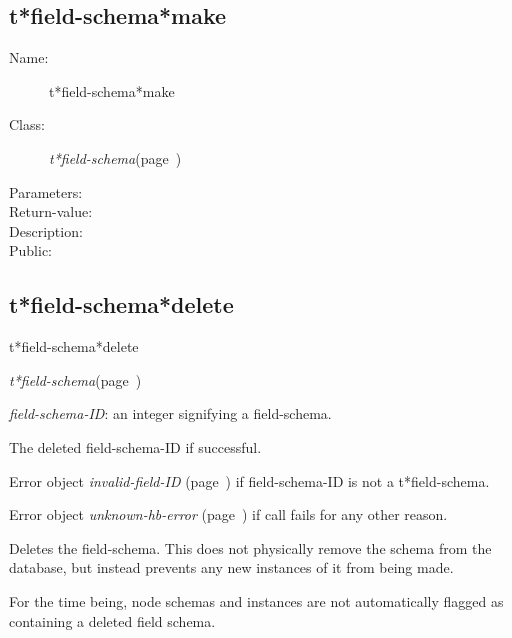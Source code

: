 \subsection{t*field-schema*make}
\label{t*field-schema*make}

\begin{description}

\item [Name:]  t*field-schema*make


\item [Class:]
{\sl t*field-schema}\hfill(page~\pageref{t*field-schema})


\item [Parameters:]


\item [Return-value:]


\item [Description:]


\item [Public:]



\end{description}
\horizontalline

\subsection{t*field-schema*delete}
\label{t*field-schema*delete}

\begin{description}
\item [Name:]  t*field-schema*delete

\item [Class:] {\sl t*field-schema}\hfill(page~\pageref{t*field-schema})

\item [Parameters:]
\item {\sl field-schema-ID}:  an integer signifying a field-schema.


\item [Return-value:]
The deleted field-schema-ID if successful.

Error object {\sl invalid-field-ID} (page~\pageref{invalid-field-ID}) if field-schema-ID
is not a t*field-schema.

Error object {\sl unknown-hb-error} (page~\pageref{unknown-hb-error}) if call fails
for any other reason.

\item [Description:]

Deletes the field-schema.  This does not physically
remove the schema from the database, but instead
prevents any new instances of it from being made.

For the time being, node schemas and instances are
not automatically flagged as containing a deleted
field schema. 


\item [Public:]



\end{description}
\horizontalline


